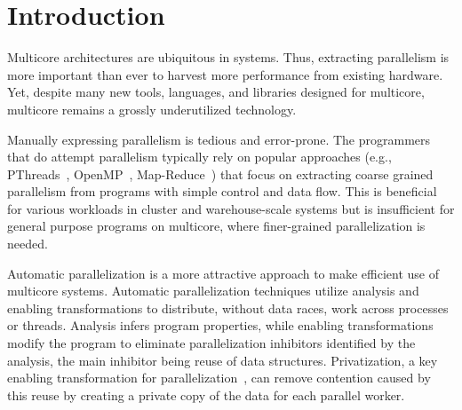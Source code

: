 \section{Introduction}

%   

Multicore architectures are ubiquitous in systems.  Thus, extracting
parallelism is more important than ever to harvest more performance
from existing hardware.
%
Yet, despite many new tools, languages, and libraries designed for
multicore, multicore remains a grossly underutilized technology.

%
Manually expressing parallelism is tedious and error-prone. The
programmers that do attempt parallelism typically rely on popular
approaches (e.g., PThreads~\cite{pthread:web},
OpenMP~\cite{openmp:web}, Map-Reduce~\cite{dean:08:cacm}) that focus
on extracting coarse grained parallelism from programs with simple
control and data flow. This is beneficial for various workloads in
cluster and warehouse-scale systems but is insufficient for general
purpose programs on multicore, where finer-grained parallelization is
needed.

%


Automatic parallelization is a more attractive approach to make
efficient use of multicore systems.
%
Automatic parallelization techniques utilize analysis and enabling
transformations to distribute, without data races, work across
processes or threads.
%
Analysis infers program properties, while enabling transformations
modify the program to eliminate parallelization inhibitors identified
by the analysis, the main inhibitor being reuse of data structures.
Privatization, a key enabling transformation for
parallelization~\cite{citations_from_privateer}, can remove contention
caused by this reuse by creating a private copy of the data for each parallel
worker.

